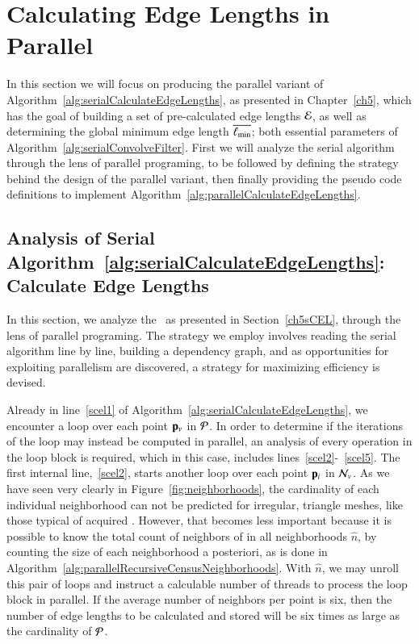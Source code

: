 %
%
%
%
\section{Calculating Edge Lengths in Parallel}
\label{ch6sCELP}
In this section we will focus on producing the parallel variant of  Algorithm~\ref{alg:serialCalculateEdgeLengths}, as presented in Chapter~\ref{ch5}, which has the goal of building a set of pre-calculated edge lengths $\mathcal{E}$, as well as determining the global minimum edge length $\overline{\ell_\text{min}}$; both essential parameters of Algorithm~\ref{alg:serialConvolveFilter}. First we will analyze the serial algorithm through the lens of parallel programing, to be followed by defining the strategy behind the design of the parallel variant, then finally providing the pseudo code definitions to implement Algorithm~\ref{alg:parallelCalculateEdgeLengths}.


%
%
\subsection{Analysis of Serial Algorithm~\ref{alg:serialCalculateEdgeLengths}: Calculate Edge Lengths}
\label{ch6sCELPssASACEL}
In this section, we analyze the~ as presented in Section~\ref{ch5sCEL}, through the lens of parallel programing. The strategy we employ involves reading the serial algorithm line by line, building a dependency graph, and as opportunities for exploiting parallelism are discovered, a strategy for maximizing efficiency is devised.

Already in line~\ref{scel1} of Algorithm~\ref{alg:serialCalculateEdgeLengths}, we encounter a loop over each point $\mathbf{p}_v$ in $\mathcal{P}$. In order to determine if the iterations of the loop may instead be computed in parallel, an analysis of every operation in the loop block is required, which in this case, includes lines~\ref{scel2}-~\ref{scel5}. The first internal line,~\ref{scel2}, starts another loop over each point $\mathbf{p}_i$ in $\mathcal{N}_v$.  As we have seen very clearly in Figure~\ref{fig:neighborhoods}, the cardinality of each individual neighborhood can not be predicted for irregular, triangle meshes, like those typical of acquired \tdd{}. However, that becomes less important because it is possible to know the total count of neighbors of in all neighborhoods $\hat{n}$, by counting the size of each neighborhood a posteriori, as is done in Algorithm~\ref{alg:parallelRecursiveCensusNeighborhoods}. With $\hat{n}$, we may unroll this pair of loops and instruct a calculable number of threads to process the loop block in parallel. If the average number of neighbors per point is six, then the number of edge lengths to be calculated and stored will be six times as large as the cardinality of $\mathcal{P}$.

